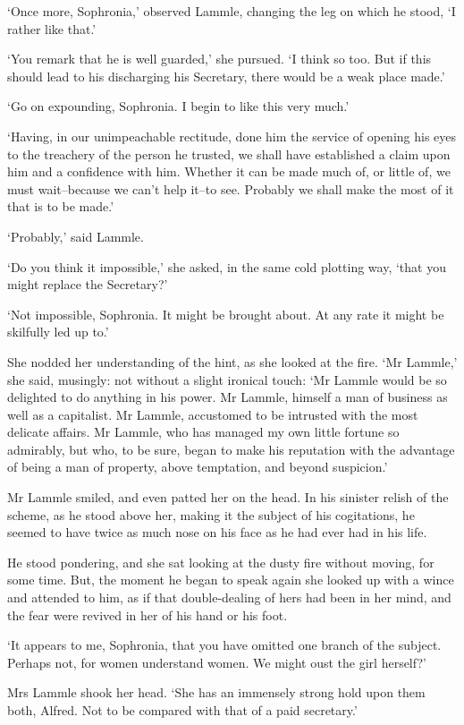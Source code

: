 ‘Once more, Sophronia,’ observed Lammle, changing the leg on which he
stood, ‘I rather like that.’

‘You remark that he is well guarded,’ she pursued. ‘I think so too. But
if this should lead to his discharging his Secretary, there would be a
weak place made.’

‘Go on expounding, Sophronia. I begin to like this very much.’

‘Having, in our unimpeachable rectitude, done him the service of opening
his eyes to the treachery of the person he trusted, we shall have
established a claim upon him and a confidence with him. Whether it
can be made much of, or little of, we must wait--because we can’t help
it--to see. Probably we shall make the most of it that is to be made.’

‘Probably,’ said Lammle.

‘Do you think it impossible,’ she asked, in the same cold plotting way,
‘that you might replace the Secretary?’

‘Not impossible, Sophronia. It might be brought about. At any rate it
might be skilfully led up to.’

She nodded her understanding of the hint, as she looked at the fire. ‘Mr
Lammle,’ she said, musingly: not without a slight ironical touch: ‘Mr
Lammle would be so delighted to do anything in his power. Mr Lammle,
himself a man of business as well as a capitalist. Mr Lammle, accustomed
to be intrusted with the most delicate affairs. Mr Lammle, who has
managed my own little fortune so admirably, but who, to be sure, began
to make his reputation with the advantage of being a man of property,
above temptation, and beyond suspicion.’

Mr Lammle smiled, and even patted her on the head. In his sinister
relish of the scheme, as he stood above her, making it the subject of
his cogitations, he seemed to have twice as much nose on his face as he
had ever had in his life.

He stood pondering, and she sat looking at the dusty fire without
moving, for some time. But, the moment he began to speak again she
looked up with a wince and attended to him, as if that double-dealing of
hers had been in her mind, and the fear were revived in her of his hand
or his foot.

‘It appears to me, Sophronia, that you have omitted one branch of the
subject. Perhaps not, for women understand women. We might oust the girl
herself?’

Mrs Lammle shook her head. ‘She has an immensely strong hold upon them
both, Alfred. Not to be compared with that of a paid secretary.’


